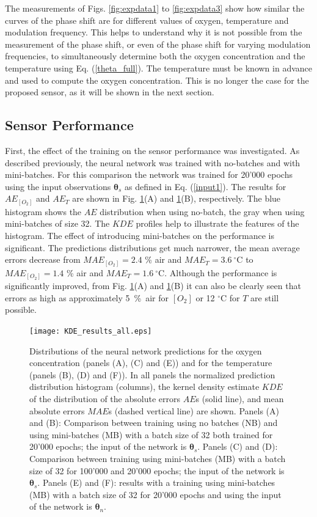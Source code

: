 \documentclass[sensors,article,submit,moreauthors,pdftex,10pt,a4paper]{Definitions/mdpi}
\begin{document}
The measurements of Figs. \ref{fig:expdata1} to \ref{fig:expdata3} show how similar the curves of the phase shift are for different values of oxygen, temperature and modulation frequency. This helps to understand why it is not possible from the measurement of the phase shift, or even of the phase shift for varying modulation frequencies, to simultaneously determine both the oxygen concentration and the temperature using Eq. (\ref{theta_full}). The temperature must be known in advance and used to compute the oxygen concentration. This is no longer the case for the proposed sensor, as it will be shown in the next section. 


\subsection{Sensor Performance}

First, the effect of the training on the sensor performance was investigated. As described previously, the neural network was trained with no-batches and with mini-batches. For this comparison the network was trained for 20'000 epochs using the input observations ${\pmb \theta}_s$ as defined in Eq. (\ref{input1}). The results for $AE_{[O_2]}$ and $AE_T$ are shown in Fig. \ref{fig:KDE_results_all}(A) and \ref{fig:KDE_results_all}(B), respectively. The blue histogram shows the $AE$ distribution when using no-batch, the gray when using mini-batches of size 32. The $KDE$ profiles help to illustrate the features of the histogram. The effect of introducing mini-batches on the performance is significant. The predictions distributions get much narrower, the mean average errors decrease from $MAE_{[O_2]}=2.4$ \% air and $MAE_{T}=3.6 \ ^\circ$C to $MAE_{[O_2]}=1.4$ \% air and $MAE_{T}=1.6 \ ^\circ$C. Although the performance is significantly improved, from Fig. \ref{fig:KDE_results_all}(A) and \ref{fig:KDE_results_all}(B) it can also be clearly seen that errors as high as approximately 5~\%~air for $[O_2]$ or 12 $^\circ$C for $T$ are still possible.

\begin{figure}[htbp]
\centering
\texttt{[image: KDE\_results\_all.eps]}
\caption{Distributions of the neural network predictions for the oxygen concentration (panels (A), (C) and (E)) and for the temperature (panels (B), (D) and (F)). In all panels the normalized prediction distribution histogram (columns), the kernel density estimate $KDE$ of the distribution of the absolute errors $AE$s (solid line), and mean absolute errors $MAE$s (dashed vertical line) are shown. Panels (A) and (B): Comparison between training using no batches (NB) and using mini-batches (MB) with a batch size of 32 both trained for 20'000 epochs; the input of the network is ${\pmb \theta}_s$. Panels (C) and (D): Comparison between training using mini-batches (MB) with a batch size of 32 for 100'000 and 20'000 epochs; the input of the network is ${\pmb \theta}_s$. Panels (E) and (F): results with a training using mini-batches (MB) with a batch size of 32 for 20'000 epochs and using the input of the network is ${\pmb \theta}_n$.}
\label{fig:KDE_results_all}
\end{figure}
\end{document}
